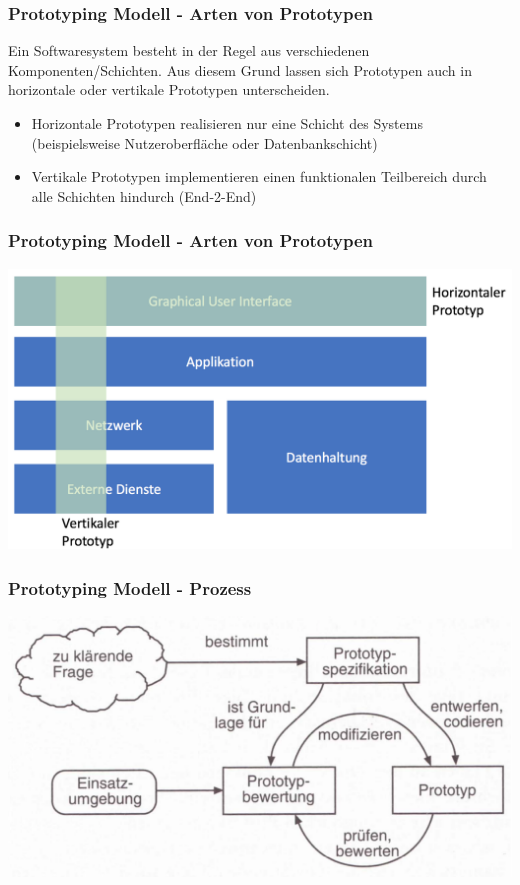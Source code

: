 \begin{frame}
\frametitle{Prototyping Modell - Arten von Prototypen}
	Ein Softwaresystem besteht in der Regel aus verschiedenen Komponenten/Schichten.
	Aus diesem Grund lassen sich Prototypen auch in horizontale oder vertikale
	Prototypen unterscheiden.
	\begin{itemize}
		\item Horizontale Prototypen realisieren nur eine Schicht des Systems
		(beispielsweise Nutzeroberfläche oder Datenbankschicht)
		\item Vertikale Prototypen implementieren einen funktionalen Teilbereich
		durch alle Schichten hindurch (End-2-End)
	\end{itemize}
\end{frame}

\begin{frame}
\frametitle{Prototyping Modell - Arten von Prototypen}
	\center\includegraphics[width=1\textwidth,
			keepaspectratio=true]{bilder/prototypen.png}
\end{frame}

\begin{frame}
\frametitle{Prototyping Modell - Prozess}
	\center\includegraphics[width=1\textwidth,
			keepaspectratio=true]{bilder/prototyp_entwicklung.png}
\end{frame}

